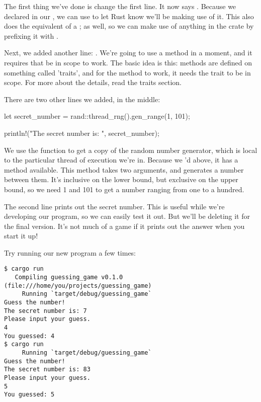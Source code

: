The first thing we've done is change the first line. It now says . Because we declared  in 
our \code{[dependencies]}, we can use  to let Rust know we'll be making use of it. This also does the 
equivalent of a ; as well, so we can make use of anything in the  crate by prefixing it with 
.

\blank

Next, we added another  line: . We're going to use a method in a moment, and it requires that 
 be in scope to work. The basic idea is this: methods are defined on something called 'traits', and for the method 
to work, it needs the trait to be in scope. For more about the details, read the traits section.

\blank

There are two other lines we added, in the middle:

\begin{rustc}
    let secret_number = rand::thread_rng().gen_range(1, 101);

    println!("The secret number is: {}", secret_number);
\end{rustc}

We use the  function to get a copy of the random number generator, which is local to the particular 
thread of execution we're in. Because we 'd above, it has a  method available. This 
method takes two arguments, and generates a number between them. It's inclusive on the lower bound, but exclusive on the upper 
bound, so we need 1 and 101 to get a number ranging from one to a hundred.

\blank

The second line prints out the secret number. This is useful while we're developing our program, so we can easily test it out. 
But we'll be deleting it for the final version. It's not much of a game if it prints out the answer when you start it up!

\blank

Try running our new program a few times:

\begin{verbatim}
$ cargo run
   Compiling guessing_game v0.1.0 (file:///home/you/projects/guessing_game)
     Running `target/debug/guessing_game`
Guess the number!
The secret number is: 7
Please input your guess.
4
You guessed: 4
$ cargo run
     Running `target/debug/guessing_game`
Guess the number!
The secret number is: 83
Please input your guess.
5
You guessed: 5
\end{verbatim}

